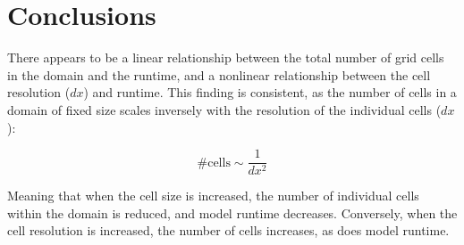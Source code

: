 \section{Conclusions}
There appears to be a linear relationship between the total number of grid cells in the domain and the runtime, and a nonlinear relationship between the cell resolution ($dx$) and runtime.
This finding is consistent, as the number of cells in a domain of fixed size scales inversely with the resolution of the individual cells ($dx$):

\begin{equation}
\text{\# cells} \sim \frac{1}{dx^2}
\end{equation}

Meaning that when the cell size is increased, the number of individual cells within the domain is reduced, and model runtime decreases. Conversely, when the cell resolution is increased, the number of cells increases, as does model runtime.

\clearpage

